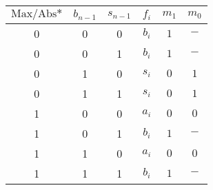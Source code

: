 \begin{tabular}{ccc|c|cc}
$\mbox{Max/Abs*}$&$b_{n-1}$&$s_{n-1}$&$f_i$&$m_1$&$m_0$\\\hline
0&0&0&$b_i$&$1$&$-$\\
0&0&1&$b_i$&$1$&$-$\\
0&1&0&$s_i$&$0$&$1$\\
0&1&1&$s_i$&$0$&$1$\\
1&0&0&$a_i$&$0$&$0$\\
1&0&1&$b_i$&$1$&$-$\\
1&1&0&$a_i$&$0$&$0$\\
1&1&1&$b_i$&$1$&$-$
\end{tabular}